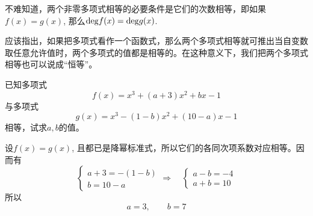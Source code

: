 不难知道，两个非零多项式相等的必要条件是它们的次数相等，即如果$f(x)=g(x)$, 那么${\rm deg}f(x)={\rm deg}g(x)$.

应该指出，如果把多项式看作一个函数式，那么两个多项式相等就可推出当自变数取任意允许值时，两个多项式的值都是相等的。在这种意义下，我们把两个多项式相等也可以说成“恒等”。

\begin{example}
已知多项式
\[f (x) =x^3+ (a+3) x^2+bx-1\]
与多项式
\[g (x) =x^3- (1-b) x^2+ (10-a) x-1\]
相等，试求$a,b$的值。    
\end{example}

\begin{solution}
设$f(x)=g(x)$, 且都已是降幂标准式，所以它们的各同次项系数对应相等。因而有    
\[\begin{cases}
    a+3=-(1-b)\\b=10-a
\end{cases}\Rightarrow\quad
\begin{cases}
    a-b=-4\\ a+b=10
\end{cases}\]
所以
\[a=3,\qquad b=7\]
\end{solution}


























